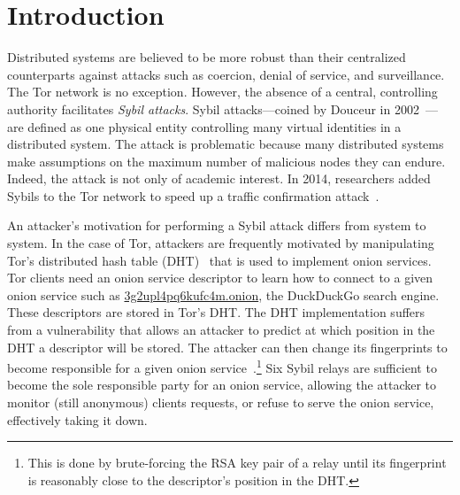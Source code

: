 \section{Introduction}
\label{sec:introduction}

Distributed systems are believed to be more robust than their centralized
counterparts against attacks such as coercion, denial of service, and
surveillance.  The Tor network is no exception.  However, the absence of a
central, controlling authority facilitates \emph{Sybil attacks}.  Sybil
attacks---coined by Douceur in 2002~\cite{Douceur2002a}---are defined as one
physical entity controlling many virtual identities in a distributed system.
The attack is problematic because many distributed systems make assumptions on
the maximum number of malicious nodes they can endure.  Indeed, the attack is
not only of academic interest.  In 2014, researchers added Sybils to the Tor
network to speed up a traffic confirmation attack~\cite{cmucert}.

An attacker's motivation for performing a Sybil attack differs from system to
system.  In the case of Tor, attackers are frequently motivated by manipulating
Tor's distributed hash table (DHT)~\cite{rendspec} that is used to implement
onion services.  Tor clients need an onion service descriptor to learn how to
connect to a given onion service such as \url{3g2upl4pq6kufc4m.onion}, the
DuckDuckGo search engine.  These descriptors are stored in Tor's DHT.  The DHT
implementation suffers from a vulnerability that allows an attacker to predict
at which position in the DHT a descriptor will be stored.  The attacker can then
change its fingerprints to become responsible for a given onion
service~\cite{Biryukov2013a}.\footnote{This is done by brute-forcing the RSA key
pair of a relay until its fingerprint is reasonably close to the descriptor's
position in the DHT.}  Six Sybil relays are sufficient to become the sole
responsible party for an onion service, allowing the attacker to monitor (still
anonymous) clients requests, or refuse to serve the onion service, effectively
taking it down.

